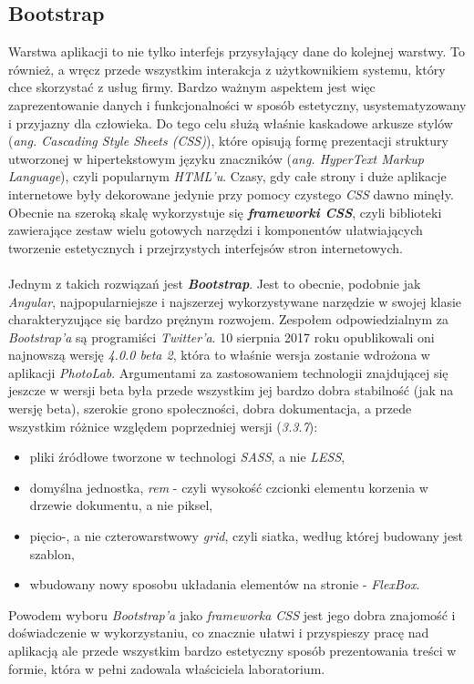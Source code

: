\subsection{Bootstrap}
\quad Warstwa aplikacji to nie tylko interfejs przysyłający dane do kolejnej warstwy. To również, a wręcz przede wszystkim interakcja z użytkownikiem systemu, który chce skorzystać z usług firmy. Bardzo ważnym aspektem jest więc zaprezentowanie danych i funkcjonalności w sposób estetyczny, usystematyzowany i przyjazny dla człowieka. Do tego celu służą właśnie kaskadowe arkusze stylów (\textit{ang. Cascading Style Sheets (CSS)}), które opisują formę prezentacji struktury utworzonej w hipertekstowym języku znaczników (\textit{ang. HyperText Markup Language}), czyli popularnym \textit{HTML'u}. Czasy, gdy całe strony i duże aplikacje internetowe były dekorowane jedynie przy pomocy czystego \textit{CSS} dawno minęły. Obecnie na szeroką skalę wykorzystuje się \textbf{\textit{frameworki CSS}}, czyli biblioteki zawierające zestaw wielu gotowych narzędzi i komponentów ułatwiających tworzenie estetycznych i przejrzystych interfejsów stron internetowych. \\
\\
Jednym z takich rozwiązań jest \textbf{\textit{Bootstrap}}. Jest to obecnie, podobnie jak \textit{Angular}, najpopularniejsze i najszerzej wykorzystywane narzędzie w swojej klasie charakteryzujące się bardzo prężnym rozwojem. Zespołem odpowiedzialnym za \textit{Bootstrap'a} są programiści \textit{Twitter'a}. 10 sierpnia 2017 roku opublikowali oni najnowszą wersję \textit{4.0.0 beta 2}, która to właśnie wersja zostanie wdrożona w aplikacji \textit{PhotoLab}. Argumentami za zastosowaniem technologii znajdującej się jeszcze w wersji beta była przede wszystkim jej bardzo dobra stabilność (jak na wersję beta), szerokie grono społeczności, dobra dokumentacja, a przede wszystkim różnice względem poprzedniej wersji (\textit{3.3.7}):
\begin{itemize}
    \item pliki źródłowe tworzone w technologi \textit{SASS}, a nie \textit{LESS},
    \item domyślna jednostka, \textit{rem} - czyli wysokość czcionki elementu korzenia w drzewie dokumentu, a nie piksel,
    \item pięcio-, a nie czterowarstwowy \textit{grid}, czyli siatka, według której budowany jest szablon,
    \item wbudowany nowy sposobu układania elementów na stronie - \textit{FlexBox}.
\end{itemize}
Powodem wyboru \textit{Bootstrap'a} jako \textit{frameworka CSS} jest jego dobra znajomość i doświadczenie w wykorzystaniu, co znacznie ułatwi i przyspieszy pracę nad aplikacją ale przede wszystkim bardzo estetyczny sposób prezentowania treści w formie, która w pełni zadowala właściciela laboratorium.

